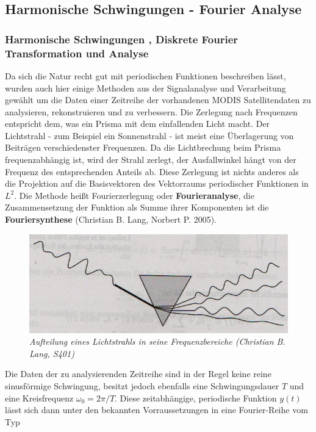 \documentclass[11pt]{report}
\begin{document}
\subsection{Harmonische Schwingungen - Fourier Analyse
}
\subsubsection{Harmonische Schwingungen , Diskrete Fourier Transformation und Analyse}
Da sich die Natur recht gut mit periodischen Funktionen beschreiben lässt, wurden auch hier einige Methoden aus der Signalanalyse und Verarbeitung gewählt um die Daten einer Zeitreihe der vorhandenen MODIS Satellitendaten zu analysieren, rekonstruieren und zu verbessern. Die Zerlegung nach Frequenzen entspricht dem, was ein Prisma mit dem einfallenden Licht macht. Der Lichtstrahl - zum Beispiel ein Sonnenstrahl - ist meist eine Überlagerung von Beiträgen verschiedenster Frequenzen. Da die Lichtbrechung beim Prisma frequenzabhängig ist, wird der Strahl zerlegt, der Ausfallwinkel hängt von der Frequenz des entsprechenden Anteils ab. Diese Zerlegung ist nichts anderes als die Projektion auf die Basisvektoren des Vektorraums periodischer Funktionen in $L^{2}$. Die Methode heißt Fourierzerlegung oder \textbf{Fourieranalyse}, die Zusammensetzung der Funktion als Summe ihrer Komponenten ist die \textbf{Fouriersynthese} (Christian B. Lang, Norbert P. 2005). 


\begin{figure}[H]
\centering
\includegraphics[scale=0.6]{./Grafiken/Fitting/FFT/prisma_cut.jpg}
\caption{\textit{Aufteilung eines Lichtstrahls in seine Frequenzbereiche (Christian B. Lang, S401)}}
\end{figure}

Die Daten der zu analysierenden Zeitreihe sind in der Regel keine reine sinusförmige Schwingung, besitzt jedoch ebenfalls eine Schwingungsdauer $T$ und eine Kreisfrequenz $\omega_0=2\pi / T$. Diese zeitabhängige, periodische Funktion $y(t)$ lässt sich dann unter den bekannten Vorraussetzungen in eine Fourier-Reihe vom Typ
\end{document}
